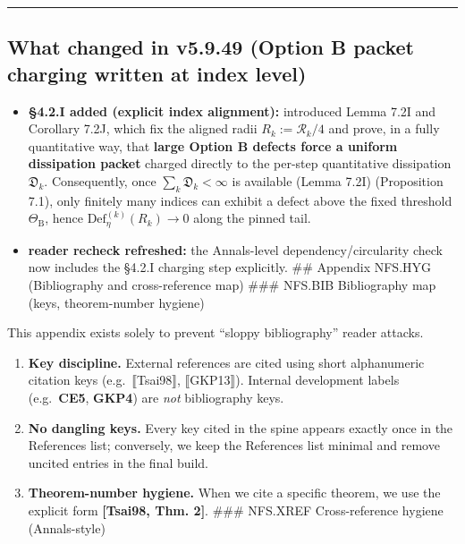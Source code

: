 \documentclass[
  11pt,
]{article}
\begin{document}
\begin{center}\rule{0.5\linewidth}{0.5pt}\end{center}

\hypertarget{what-changed-in-v5.9.49-option-b-packet-charging-written-at-index-level}{%
\subsection{What changed in v5.9.49 (Option B packet charging written at index level)}\label{what-changed-in-v5.9.49-option-b-packet-charging-written-at-index-level}}

\begin{itemize}
\item
  \textbf{§4.2.I added (explicit index alignment):} introduced Lemma 7.2I and Corollary 7.2J, which fix the aligned radii \(R_k:=\mathcal R_k/4\) and prove, in a fully quantitative way, that \textbf{large Option B defects force a uniform dissipation packet} charged directly to the per-step quantitative dissipation \(\mathfrak D_k\). Consequently, once \(\sum_k\mathfrak D_k<\infty\) is available (Lemma 7.2I) (Proposition 7.1), only finitely many indices can exhibit a defect above the fixed threshold \(\Theta_{\mathrm{B}}\), hence \(\mathrm{Def}^{(k)}_{\eta}(R_k)\to0\) along the pinned tail.
\item
  \textbf{reader recheck refreshed:} the Annals-level dependency/circularity check now includes the §4.2.I charging step explicitly. \#\# Appendix NFS.HYG (Bibliography and cross-reference map) \#\#\# NFS.BIB Bibliography map (keys, theorem-number hygiene)
\end{itemize}

This appendix exists solely to prevent ``sloppy bibliography'' reader attacks.

\begin{enumerate}
\def\labelenumi{\arabic{enumi}.}
\item
  \textbf{Key discipline.} External references are cited using short alphanumeric citation keys (e.g.~⟦Tsai98⟧, ⟦GKP13⟧). Internal development labels (e.g.~\textbf{CE5}, \textbf{GKP4}) are \emph{not} bibliography keys.
\item
  \textbf{No dangling keys.} Every key cited in the spine appears exactly once in the References list; conversely, we keep the References list minimal and remove uncited entries in the final build.
\item
  \textbf{Theorem-number hygiene.} When we cite a specific theorem, we use the explicit form \textbf{{[}Tsai98, Thm. 2{]}}. \#\#\# NFS.XREF Cross-reference hygiene (Annals-style)
\end{enumerate}
\end{document}
